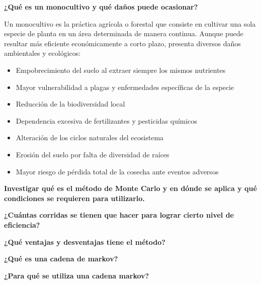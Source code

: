 \documentclass{article}
\newenvironment{question}[1]
{\par\vspace{10pt}\noindent\textbf{#1}\par\noindent\vspace{3pt}}
{\par\vspace{5pt}}
\begin{document}
\begin{question}{¿Qué es un monocultivo y qué daños puede ocasionar?}
	Un monocultivo es la práctica agrícola o forestal que consiste en cultivar una sola especie de planta en un área determinada de manera continua. Aunque puede resultar más eficiente económicamente a corto plazo, presenta diversos daños ambientales y ecológicos:

	\begin{itemize}
		\item Empobrecimiento del suelo al extraer siempre los mismos nutrientes
		\item Mayor vulnerabilidad a plagas y enfermedades específicas de la especie
		\item Reducción de la biodiversidad local
		\item Dependencia excesiva de fertilizantes y pesticidas químicos
		\item Alteración de los ciclos naturales del ecosistema
		\item Erosión del suelo por falta de diversidad de raíces
		\item Mayor riesgo de pérdida total de la cosecha ante eventos adversos
	\end{itemize}
\end{question}

\begin{question}{Investigar qué es el método de Monte Carlo y en dónde se aplica y qué condiciones se requieren para utilizarlo.}
\end{question}

\begin{question}{¿Cuántas corridas se tienen que hacer para lograr cierto nivel de eficiencia?}
\end{question}

\begin{question}{¿Qué ventajas y desventajas tiene el método?}
\end{question}

\begin{question}{¿Qué es una cadena de markov?}
\end{question}

\begin{question}{¿Para qué se utiliza una cadena markov?}
\end{question}
\end{document}
